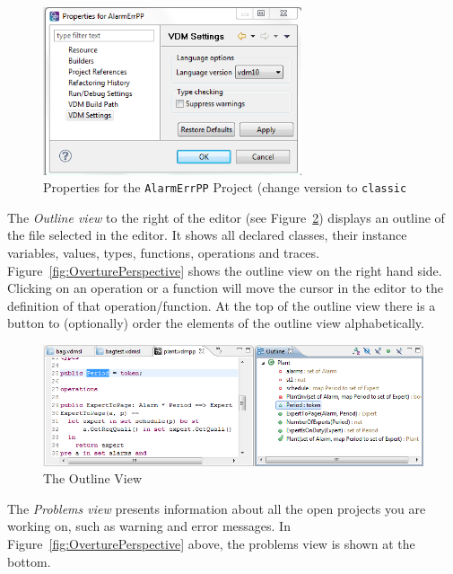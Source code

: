 %
\begin{figure}[!htb]
\begin{center}
  \includegraphics[width=3.0in]{figures/settings}
  \caption[labelInTOC]{Properties for the \texttt{AlarmErrPP} Project (change version to \texttt{classic}}
  \label{fig:settings}
\end{center}
\end{figure}



The \emph{Outline view} to the right of the editor (see Figure~\ref{fig:OutlineView}) displays an outline of the file selected in the editor. It shows all declared classes, their instance variables, values, types, functions, operations and traces. Figure~\ref{fig:OverturePerspective} shows the outline view on the right hand side. Clicking on an operation or a function will move the cursor in the editor to the definition of that operation/function. At the top of the outline view there is a button to (optionally) order
the elements of the outline view alphabetically.
%
\begin{figure}[!htb]
\begin{center}
  \includegraphics[width=4.5in]{figures/OutlineView}
  \caption[labelInTOC]{The Outline View}
  \label{fig:OutlineView}
\end{center}
\end{figure}
%
The \emph{Problems view} presents information about all the open projects you are working on, such as warning and error messages. In Figure~\ref{fig:OverturePerspective} above, the problems view is shown at the bottom.


